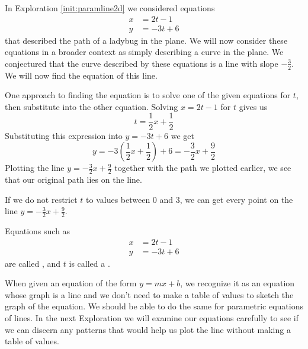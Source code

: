 \documentclass{ximera}
\begin{document}
\begin{exploration}\label{init:paramline2dpart2}
In Exploration \ref{init:paramline2d} we considered equations
\begin{align*}
x&=2t-1\\
y&=-3t+6
\end{align*}
that described the path of a ladybug in the plane.  We will now consider these equations in a broader context as simply describing a curve in the plane.  We conjectured that the curve described by these equations is a line with slope $-\frac{3}{2}$.  We will now find the equation of this line.

One approach to finding the equation is to solve one of the given equations for $t$, then substitute into the other equation.
Solving $x=2t-1$ for $t$ gives us
$$t=\frac{1}{2}x+\frac{1}{2}$$
Substituting this expression into $y=-3t+6$ we get
$$y=-3\left(\frac{1}{2}x+\frac{1}{2}\right)+6=-\frac{3}{2}x+\frac{9}{2}$$
Plotting the line $y=-\frac{3}{2}x+\frac{9}{2}$ together with the path we plotted earlier, we see that our original path lies on the line.

  \begin{center}
\end{center}

If we do not restrict $t$ to values between 0 and 3, we can get every point on the line $y=-\frac{3}{2}x+\frac{9}{2}$.  
\end{exploration}

Equations such as
\begin{align*}
x&=2t-1\\
y&=-3t+6
\end{align*}
are called , and $t$ is called a .

When given an equation of the form $y=mx+b$, we recognize it as an equation whose graph is a line and we don't need to make a table of values to sketch the graph of the equation.  We should be able to do the same for parametric equations of lines.  In the next Exploration we will examine our equations carefully to see if we can discern any patterns that would help us plot the line without making a table of values.  
\end{document}
